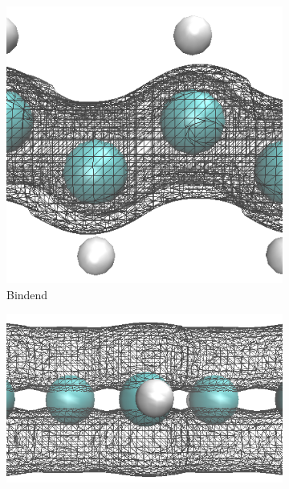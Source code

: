 \begin{frame}
\begin{figure}
	\centering
	\begin{subfigure}{0.25\textwidth}
		\includegraphics[width = \textwidth]{Images/polyacetylene/wavefunctions/Mid_band_2_Cut}
		\caption{Bindend}
		\label{image_homo1}
	\end{subfigure}\hspace*{2cm}
	\begin{subfigure}{0.41\textwidth}
		\centering
		\includegraphics[width = \textwidth]{Images/polyacetylene/wavefunctions/Mid_band_2_Side_View_Cut}

\end{subfigure}
\end{figure}
\end{frame}
